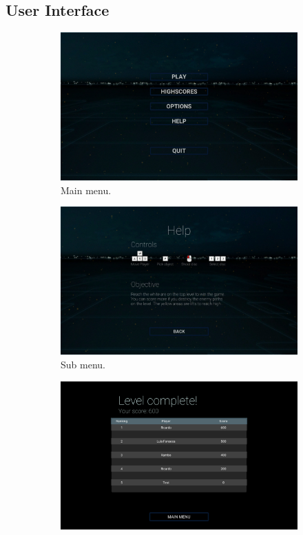 \documentclass[a4paper]{article}
\begin{document}
\subsection{User Interface}
  \begin{figure}[H]
      \begin{subfigure}[b]{0.33\linewidth}
          \includegraphics[width=\linewidth]{MainMenu.jpg}
          \caption{Main menu.}
      \end{subfigure}
      \begin{subfigure}[b]{0.33\linewidth}
          \includegraphics[width=\linewidth]{HelpMenu.jpg}
          \caption{Sub menu.}
      \end{subfigure}
      \begin{subfigure}[b]{0.33\linewidth}
          \includegraphics[width=\linewidth]{EndMenu.jpg}

\end{subfigure}
\end{figure}
\end{document}
